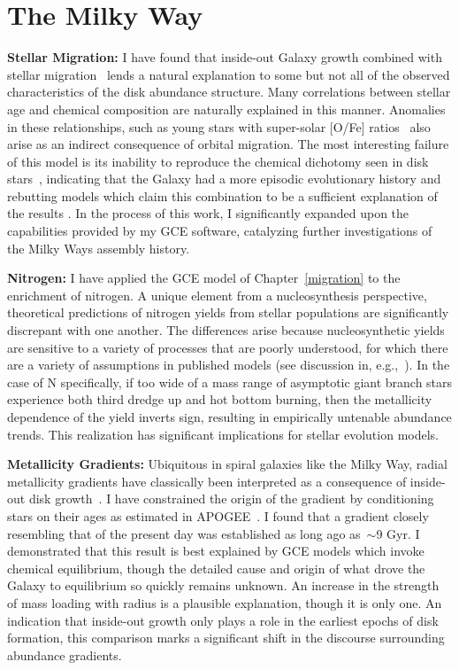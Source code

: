 \documentclass[main.tex]{subfiles}
\begin{document}
\section{The Milky Way}
\label{conclusions:sec:milkyway}
\textbf{Stellar Migration:} I have found that inside-out Galaxy growth
\citep[e.g.,][]{Bird2013} combined with stellar migration~\citep{Sellwood2002}
lends a natural explanation to some but not all of the observed characteristics
of the disk abundance structure.
Many correlations between stellar age and chemical composition
\citep[e.g.,][]{Feuillet2019} are naturally explained in this manner.
Anomalies in these relationships, such as young stars with super-solar [O/Fe]
ratios~\citep[e.g.,][]{Hekker2019} also arise as an indirect consequence of
orbital migration.
The most interesting failure of this model is its inability to reproduce the
chemical dichotomy seen in disk stars~\citep[e.g.,][]{Hayden2015}, indicating
that the Galaxy had a more episodic evolutionary history
\citep[e.g.,][]{Chiappini1997, Spitoni2021} and rebutting models which claim
this combination to be a sufficient explanation of the results
\citep[e.g.,][]{Sharma2021, Chen2023}.
In the process of this work, I significantly expanded upon the capabilities
provided by my GCE software, catalyzing further investigations of the Milky
Ways assembly history.
\par
\textbf{Nitrogen:} I have applied the GCE model of Chapter~\ref{migration} to
the enrichment of nitrogen.
A unique element from a nucleosynthesis perspective, theoretical predictions
of nitrogen yields from stellar populations are significantly discrepant with
one another.
The differences arise because nucleosynthetic yields are sensitive to a
variety of processes that are poorly understood, for which there are a variety
of assumptions in published models (see discussion in,
e.g.,~\citealt{Chieffi2001, Ventura2013}).
In the case of N specifically, if too wide of a mass range of asymptotic giant
branch stars experience both third dredge up and hot bottom burning, then the
metallicity dependence of the yield inverts sign, resulting in empirically
untenable abundance trends.
This realization has significant implications for stellar evolution models.
\par
\textbf{Metallicity Gradients:} Ubiquitous in spiral galaxies like the Milky
Way, radial metallicity gradients have classically been interpreted as a
consequence of inside-out disk growth~\citep[e.g.,][]{Kauffmann1996}.
I have constrained the origin of the gradient by conditioning stars on their
ages as estimated in APOGEE~\citep{Majewski2017, Mackereth2019b}.
I found that a gradient closely resembling that of the present day was
established as long ago as~$\sim$9 Gyr.
I demonstrated that this result is best explained by GCE models which invoke
chemical equilibrium, though the detailed cause and origin of what drove the
Galaxy to equilibrium so quickly remains unknown.
An increase in the strength of mass loading with radius is a plausible
explanation, though it is only one.
An indication that inside-out growth only plays a role in the earliest epochs
of disk formation, this comparison marks a significant shift in the discourse
surrounding abundance gradients.
\end{document}
